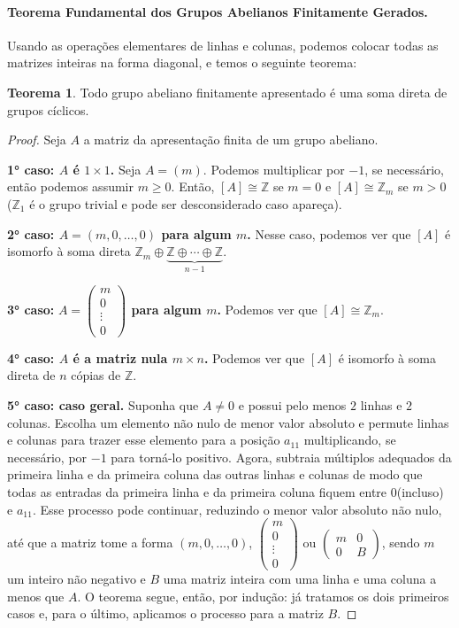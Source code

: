 \documentclass[a4paper,portuguese,11pt,twoside, leqno]{book}
\theoremstyle{definition}
\newtheorem{theorem}{Teorema}[section]
\begin{document}
	\paragraph{Teorema Fundamental dos Grupos Abelianos Finitamente Gerados.} Usando as operações elementares de linhas e colunas, podemos colocar todas as matrizes inteiras na forma diagonal, e temos o seguinte teorema:
	\begin{theorem}
		\label{teorema fundamental abelianos finitamente apresentados}
		Todo grupo abeliano finitamente apresentado é uma soma direta de grupos cíclicos.
	\end{theorem}
	\begin{proof}
		Seja $A$ a matriz da apresentação finita de um grupo abeliano. 
		\par\textbf{1° caso: $A$ é $1\times1$.} Seja $A = (m)$. Podemos multiplicar por $-1$, se necessário, então podemos assumir $m\geq0$. Então, $[A]\cong\mathbb{Z}$ se $m=0$ e $[A]\cong\mathbb{Z}_m$ se $m>0$ ($\mathbb{Z}_1$ é o grupo trivial e pode ser desconsiderado caso apareça).
		\par\textbf{2° caso: $A = (m,0,\dots,0)$ para algum $m$.} Nesse caso, podemos ver que $[A]$ é isomorfo à soma direta $\mathbb{Z}_m\oplus\underbrace{\mathbb{Z}\oplus\cdots\oplus\mathbb{Z}}_{n-1}$.
		\par\textbf{3° caso:} \textbf{$A = \begin{pmatrix}m\\0\\\vdots\\0\end{pmatrix}$ para algum $m$.} Podemos ver que $[A]\cong\mathbb{Z}_m$.
		\par\textbf{4° caso: $A$ é a matriz nula $m\times n$.} Podemos ver que $[A]$ é isomorfo à soma direta de $n$ cópias de $\mathbb{Z}$.
		\par\textbf{5° caso: caso geral.} Suponha que $A\neq0$ e possui pelo menos $2$ linhas e $2$ colunas. Escolha um elemento não nulo de menor valor absoluto e permute linhas e colunas para trazer esse elemento para a posição $a_{11}$ multiplicando, se necessário, por $-1$ para torná-lo positivo. Agora, subtraia múltiplos adequados da primeira linha e da primeira coluna das outras linhas e colunas de modo que todas as entradas da primeira linha e da primeira coluna fiquem entre $0$(incluso) e $a_{11}$. Esse processo pode continuar, reduzindo o menor valor absoluto não nulo, até que a matriz tome a forma $(m,0,\dots,0)$, $\begin{pmatrix}
		m\\
		0\\
		\vdots\\
		0
		\end{pmatrix}$ ou $\begin{pmatrix}
		m & 0 \\
		0 & B
		\end{pmatrix}$, sendo $m$ um inteiro não negativo e $B$ uma matriz inteira com uma linha e uma coluna a menos que $A$. O teorema segue, então, por indução: já tratamos os dois primeiros casos e, para o último, aplicamos o processo para a matriz $B$.  
	\end{proof}
\end{document}
